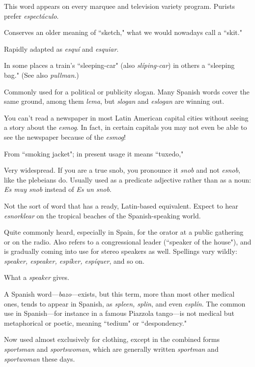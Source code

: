  This word appears on every marquee and television
variety program. Purists prefer \emph{espectáculo}.

 Conserves an older meaning of ``sketch," what we
would nowadays call a ``skit."

 Rapidly adapted as \emph{esquí} and \emph{esquiar}.

 In some places a train's ``sleeping-car" (also
\emph{slíping-car}) in others a ``sleeping bag." (See also \emph{pullman}.)

 Commonly used for a political or publicity slogan.
Many Spanish words cover the same ground, among them \emph{lema}, but
\emph{slogan} and \emph{eslogan} are winning out.

 You can't read a newspaper in most Latin American
capital cities without seeing a story about the \emph{esmog}. In fact, in certain capitals you may not even be able to see the newspaper because
of the \emph{esmog}!

 From ``smoking jacket"; in present usage it means
``tuxedo,"

 Very widespread. If you are a true snob, you pronounce
it \emph{snob} and not \emph{esnob}, like the plebeians do. Usually used as a predicate
adjective rather than as a noun: \emph{Es muy snob} instead of \emph{Es un snob}.

 Not the sort of word that has a ready, Latin-based
equivalent. Expect to hear \emph{esnorklear} on the tropical beaches of the
Spanish-speaking world.

 Quite commonly heard, especially in Spain, for
the orator at a public gathering or on the radio. Also refers to a congressional leader (``speaker of the house"), and is gradually coming
into use for stereo speakers as well. Spellings vary wildly: \emph{speaker,
	espeaker, espíker, espíquer}, and so on.

 What a \emph{speaker} gives.

 A Spanish word---\emph{bazo}---exists, but this term, more
than most other medical ones, tends to appear in Spanish, as \emph{spleen,
	splin}, and even \emph{esplín}. The common use in Spanish---for instance in
a famous Piazzola tango---is not medical but metaphorical or poetic,
meaning ``tedium" or ``despondency."

 Now used almost exclusively for clothing, except in
the combined forms \emph{sportsman} and \emph{sportswoman}, which are generally
written \emph{sportman} and \emph{sportwoman} these days.

